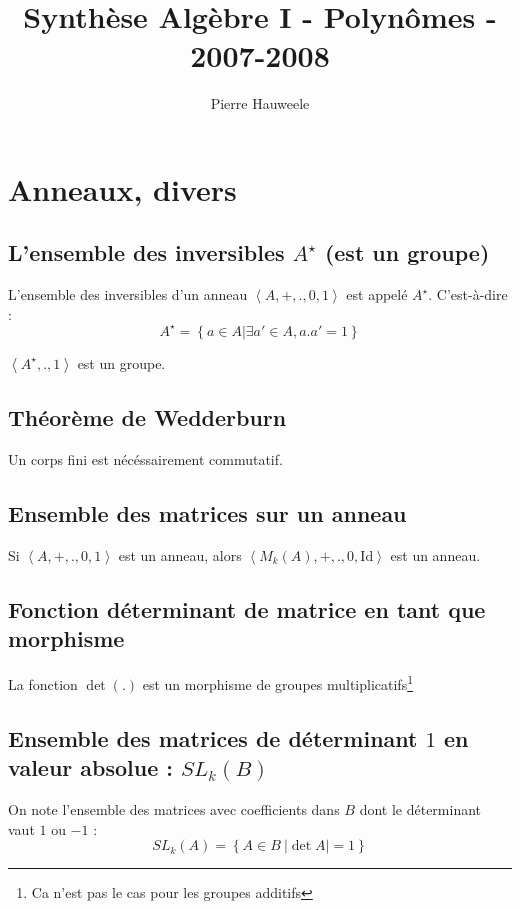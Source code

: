 \documentclass[a4paper,10pt]{article}
\author{Pierre Hauweele}
\title{Synthèse Algèbre I - Polynômes - 2007-2008}
\date{}
\newcommand{\grp}[1]{\left\langle #1 \right\rangle} %
\newcommand{\set}[1]{\left\lbrace #1 \right\rbrace } %
\newcommand{\id}{\mathrm{Id}} %
\newcommand{\mfootnote}[1]{\up{(}\footnote{#1}\up{)}}
\begin{document}
\maketitle
\tableofcontents
\newpage
\section{Anneaux, divers}
 \subsection{L'ensemble des inversibles $A^\star$\label{ensinv} (est un groupe)}
  L'ensemble des inversibles d'un anneau $\grp{A,+,.,0,1}$ est appelé $A^\star$. C'est-à-dire :
  $$A^\star=\set{a\in A | \exists a' \in A, a . a' = 1}$$

  $\grp{A^\star,.,1}$ est un groupe.

 \subsection{Théorème de Wedderburn}
  Un corps fini est nécéssairement commutatif.

 \subsection{Ensemble des matrices sur un anneau\label{matsuranneau}}
  Si $\grp{A,+,.,0,1}$ est un anneau, alors $\grp{M_k(A),+,.,0,\id}$ est un anneau.

 \subsection{Fonction déterminant de matrice en tant que morphisme\label{detmorphisme}}
  La fonction $\det(.)$ est un morphisme de groupes multiplicatifs\mfootnote{Ca n'est pas le cas pour les groupes additifs}
 
 \subsection{Ensemble des matrices de déterminant $1$ en valeur absolue : ${SL}_k(B)$}
  On note l'ensemble des matrices avec coefficients dans $B$ dont le déterminant vaut $1$ ou $-1$ :
  $${SL}_k(A)=\set{A \in B ~| \det A|=1}$$
\end{document}
